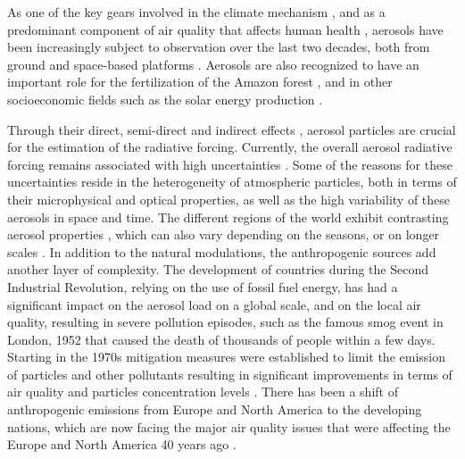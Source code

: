 \documentclass[journal abbreviation, manuscript]{copernicus}
\begin{document}


\introduction  %
As one of the key gears involved in the climate mechanism \citep{poschl2005atmospheric}, and as a predominant component of air quality that affects human health \citep{burnett2014integrated}, aerosols have been increasingly subject to observation over the last two decades, both from ground and space-based platforms \citep{holben2001emerging,kaufman2002satellite}.  Aerosols are also recognized to have an important role for the fertilization of the Amazon forest \citep{yu2015fertilizing}, and in other socioeconomic fields such as the solar energy production \citep{Li11867,labordena2018blue}.

Through their direct, semi-direct and indirect effects \citep{rap2013natural,johnson2004semi,lohmann2005global}, aerosol particles are crucial for the estimation of the radiative forcing. Currently, the overall aerosol radiative forcing remains associated with high uncertainties \citep{haywood2000estimates, stocker2014climate}. Some of the reasons for these uncertainties reside in the heterogeneity of atmospheric particles, both in terms of their microphysical and optical properties, as well as the high variability of these aerosols in space and time. The different regions of the world exhibit contrasting aerosol properties \citep{holben2001emerging}, which can also vary depending on the seasons, or on longer scales \citep{streets2009anthropogenic}. In addition to the natural modulations, the anthropogenic sources add another layer of complexity. The development of countries during the Second Industrial Revolution, relying on the use of fossil fuel energy, has had a significant impact on the aerosol load on a global scale, and on the local air quality, resulting in severe pollution episodes, such as the famous smog event in London, 1952 \citep{bell2004retrospective} that caused the death of thousands of people within a few days.
Starting in the 1970s mitigation measures were established to limit the emission of particles and other pollutants \citep{bryner1995blue,turnock2016impact} resulting in significant improvements in terms of air quality and particles concentration levels \citep{likens2001long}. There has been a shift of anthropogenic emissions from Europe and North America to the developing nations, which are now facing the major air quality issues that were affecting the Europe and North America 40 years ago \citep{streets2008aerosol,ramachandran2012aerosol}.
\end{document}
